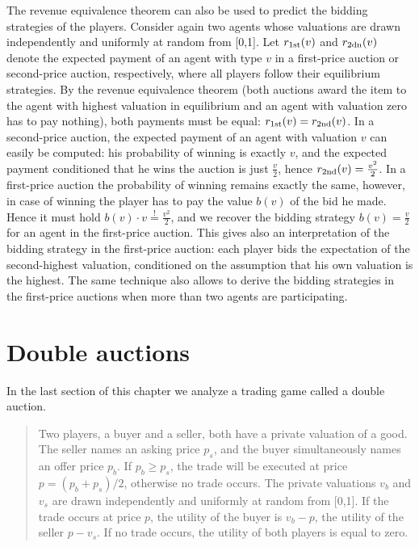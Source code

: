 The revenue equivalence theorem can also be used to predict the bidding strategies of the players. Consider again two agents whose valuations are drawn independently and uniformly at random from [0,1]. Let $r_{\rm 1st}(v)$ and $r_{\rm 2dn}(v)$ denote the expected payment of an agent with type $v$ in a first-price auction or second-price auction, respectively, where all players follow their equilibrium strategies. By the revenue equivalence theorem (both auctions award the item to the agent with highest valuation in equilibrium and an agent with valuation zero has to pay nothing), both payments must be equal: $r_{\rm 1st}(v) = r_{\rm 2nd}(v)$. In a second-price auction, the expected payment of an agent with valuation $v$ can easily be computed: his probability of winning is exactly $v$, and the expected payment conditioned that he wins the auction is just $\frac{v}{2}$, hence $r_{\rm 2nd}(v) = \frac{v^2}{2}$. In a first-price auction the probability of winning remains exactly the same, however, in case of winning the player has to pay the value $b(v)$ of the bid he made. Hence it must hold $b(v)\cdot v \stackrel{!}{=} \frac{v^2}{2}$, and we recover the bidding strategy $b(v)=\frac{v}{2}$ for an agent in the first-price auction. This gives also an interpretation of the bidding strategy in the first-price auction: each player bids the expectation of the second-highest valuation, conditioned on the assumption that his own valuation is the highest. The same technique also allows to derive the bidding strategies in the first-price auctions when more than two agents are participating.


\section{Double auctions}
\label{sec:auc:6}
In the last section of this chapter we analyze a trading game called a double auction. 

\begin{quote}
Two players, a buyer and a seller, both have a private valuation of a good. The seller names an asking price $p_s$, and the buyer simultaneously names an offer price $p_b$. If $p_b \geq p_s$, the trade will be executed at price $p = (p_b + p_s)/2$, otherwise no trade occurs. 
The private valuations $v_b$ and $v_s$ are drawn independently and uniformly at random from [0,1]. If the trade occurs at price $p$, the utility of the buyer is $v_b - p$, the utility of the seller $p-v_s$. If no trade occurs, the utility of both players is equal to zero.
\end{quote}

